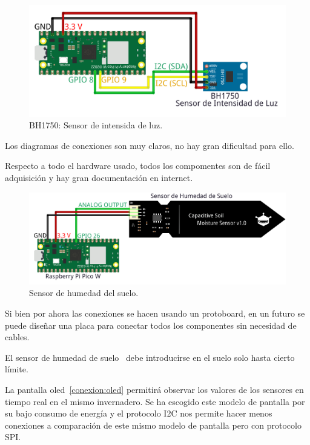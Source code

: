 \begin{figure}[h]
	\centering
	\includegraphics[width=1\textwidth]{img/diagramas/BH1750.png}
	\caption{BH1750: Sensor de intensida de luz.}
\end{figure}

Los diagramas de conexiones son muy claros, no hay gran dificultad para ello.


Respecto a todo el hardware usado, todos los compomentes son de fácil adquisición y hay gran documentación en internet.


\begin{figure}[h]
	\centering
	\includegraphics[width=1\textwidth]{img/diagramas/Sensor_humedad_suelo.png}
	\caption{Sensor de humedad del suelo.}
\end{figure}

Si bien por ahora las conexiones se hacen usando un protoboard, en un futuro se puede diseñar una placa para conectar todos los componentes sin necesidad de cables.

El sensor de humedad de suelo~\cite{wiki:SensorHumedadSuelo} debe introducirse en el suelo solo hasta cierto límite.

La pantalla oled~\ref{conexion:oled} permitirá observar los valores de los sensores en tiempo real en el mismo invernadero. Se ha escogido este modelo de pantalla por su bajo consumo de energía y el protocolo I2C nos permite hacer menos conexiones a comparación de este mismo modelo de pantalla pero con protocolo SPI.

